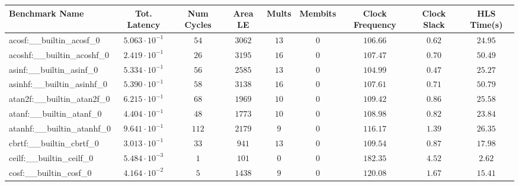 \begin{tabular}{|l|c|c|c|c|c|c|c|c|}
\hline
Benchmark Name                            & Tot. Latency            & Num Cycles & Area LE   & Mults   & Membits & Clock Frequency & Clock Slack & HLS Time(s) \\
\hline
acosf:\_\_builtin\_acosf\_0               & $ 5.063 \cdot 10^{-1} $ & $ 54     $ & $ 3062  $ & $ 13  $ & $ 0   $ & $ 106.66      $ & $ 0.62    $ & $ 24.95   $ \\
acoshf:\_\_builtin\_acoshf\_0             & $ 2.419 \cdot 10^{-1} $ & $ 26     $ & $ 3195  $ & $ 16  $ & $ 0   $ & $ 107.47      $ & $ 0.70    $ & $ 50.49   $ \\
asinf:\_\_builtin\_asinf\_0               & $ 5.334 \cdot 10^{-1} $ & $ 56     $ & $ 2585  $ & $ 13  $ & $ 0   $ & $ 104.99      $ & $ 0.47    $ & $ 25.27   $ \\
asinhf:\_\_builtin\_asinhf\_0             & $ 5.390 \cdot 10^{-1} $ & $ 58     $ & $ 3138  $ & $ 16  $ & $ 0   $ & $ 107.61      $ & $ 0.71    $ & $ 50.79   $ \\
atan2f:\_\_builtin\_atan2f\_0             & $ 6.215 \cdot 10^{-1} $ & $ 68     $ & $ 1969  $ & $ 10  $ & $ 0   $ & $ 109.42      $ & $ 0.86    $ & $ 25.58   $ \\
atanf:\_\_builtin\_atanf\_0               & $ 4.404 \cdot 10^{-1} $ & $ 48     $ & $ 1773  $ & $ 10  $ & $ 0   $ & $ 108.98      $ & $ 0.82    $ & $ 23.84   $ \\
atanhf:\_\_builtin\_atanhf\_0             & $ 9.641 \cdot 10^{-1} $ & $ 112    $ & $ 2179  $ & $ 9   $ & $ 0   $ & $ 116.17      $ & $ 1.39    $ & $ 26.35   $ \\
cbrtf:\_\_builtin\_cbrtf\_0               & $ 3.013 \cdot 10^{-1} $ & $ 33     $ & $ 941   $ & $ 13  $ & $ 0   $ & $ 109.54      $ & $ 0.87    $ & $ 17.98   $ \\
ceilf:\_\_builtin\_ceilf\_0               & $ 5.484 \cdot 10^{-3} $ & $ 1      $ & $ 101   $ & $ 0   $ & $ 0   $ & $ 182.35      $ & $ 4.52    $ & $ 2.62    $ \\
cosf:\_\_builtin\_cosf\_0                 & $ 4.164 \cdot 10^{-2} $ & $ 5      $ & $ 1438  $ & $ 9   $ & $ 0   $ & $ 120.08      $ & $ 1.67    $ & $ 15.41   $ \\

\end{tabular}
